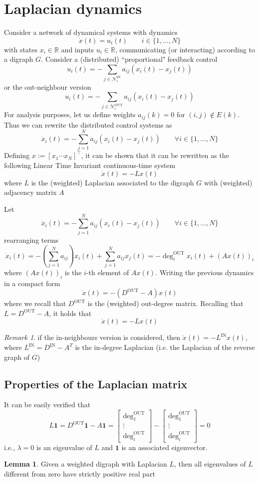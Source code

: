 \documentclass{book}
\newcommand{\R}{\mathbb{R}}
\theoremstyle{theoremv2}
\theoremstyle{defv2}
\theoremstyle{remark}
\newtheorem*{remark}{Remark}
\theoremstyle{remark}
\theoremstyle{definition}
\newtheorem*{lemma}{Lemma}
\theoremstyle{definition}
\begin{document}
\section{Laplacian dynamics}
Consider a network of dynamical systems with dynamics 
\[
    \dot{x}(t) = u_i(t) \qquad i \in \{1,\dots,N\}
\]
with states $x_i\in\R$ and inputs $u_i\in\R$, communicating (or interacting) according to a digraph $G$. Consider a (distributed) ``proportional" feedback control 
\[
    u_i(t) = - \displaystyle\sum_{j\in\mathcal{N}_i^{\text{IN}}}a_{ij}(x_i(t)-x_j(t))
\]
or the out-neighbour version
\[
    u_i(t) = - \displaystyle\sum_{j\in\mathcal{N}_i^{\text{OUT}}}a_{ij}(x_i(t)-x_j(t))
\]
For analysis purposes, let us define weights $a_{ij}(k)=0$ for $(i,j)\notin E(k)$. Thus we can rewrite the distributed control systems as 
\[
    \dot{x}_i(t) = - \displaystyle\sum_{j=1}^{N} a_{ij} (x_i(t)-x_j(t)) \qquad \forall i\in\{1,\dots,N\}
\]
Defining $x:=[x_1 \cdots x_N]^\top$, it can be shown that it can be rewritten as the following Linear Time Invariant continuous-time system 
\[
    \dot{x}(t) = -Lx(t)
\]
where $L$ is the (weighted) Laplacian associated to the digraph $G$ with (weighted) adjacency matrix $A$ 

Let 
\[
    \dot{x}_i(t) = - \displaystyle\sum_{j=1}^{N} a_{ij} (x_i(t)-x_j(t)) \qquad \forall i\in\{1,\dots,N\}
\]
rearranging terms 
\[
    \dot{x}_i(t) = -\left(\displaystyle\sum_{j=1}^{N} a_{ij}\right) x_i(t) + \displaystyle\sum_{j=1}^{N} a_{ij}x_j(t) = -\deg_i^{\text{OUT}}x_i(t)+ (Ax(t))_i
\]
where $(Ax(t))_i$ is the $i$-th element of $Ax(t)$. Writing the previous dynamics in a compact form 
\[
    \dot{x}(t) = -(D^{\text{OUT}}-A)x(t)
\]
where we recall that $D^{\text{OUT}}$ is the (weighted) out-degree matrix. Recalling that $L=D^{\text{OUT}}-A$, it holds that 
\[
    \dot{x}(t) = -Lx(t)
\]
\begin{remark}
    if the in-neighbours version is considered, then $\dot{x}(t) = -L^{\text{IN}}x(t)$, where $L^{\text{IN}}=D^{\text{IN}}-A^T$ is the in-degree Laplacian (i.e. the Laplacian of the reverse graph of $G$)
\end{remark}
\subsection{Properties of the Laplacian matrix}
It can be easily verified that 
\[
    L\mathbf{1} = D^{\text{OUT}}\mathbf{1}-A\mathbf{1} = \begin{bmatrix}
        \deg_1^{\text{OUT}} \\ \vdots \\ \deg_i^{\text{OUT}}
    \end{bmatrix} - \begin{bmatrix}
        \deg_1^{\text{OUT}} \\ \vdots \\ \deg_i^{\text{OUT}}
    \end{bmatrix} = 0
\]
i.e., $\lambda=0$ is an eigenvalue of $L$ and $\mathbf{1}$ is an associated eigenvector.
\begin{lemma}
    Given a weighted digraph with Laplacian $L$, then all eigenvalues of $L$ different from zero have strictly positive real part
\end{lemma}
\end{document}
